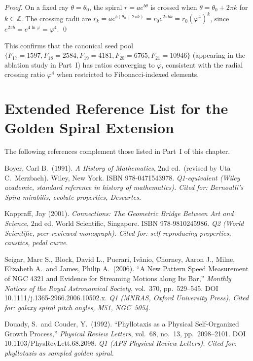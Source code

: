 \begin{proof}
On a fixed ray \(\theta = \theta_0\), the spiral \(r = ae^{b\theta}\)
is crossed when \(\theta = \theta_0 + 2\pi k\) for \(k \in \mathbb{Z}\).
The crossing radii are \(r_k = ae^{b(\theta_0+2\pi k)}
= r_0 e^{2\pi b k} = r_0 (\varphi^4)^k\), since
\(e^{2\pi b} = e^{4\ln\varphi} = \varphi^4\).
\qed
\end{proof}

\begin{remark}
This confirms that the canonical seed pool
\(\{F_{17}=1597, F_{18}=2584, F_{19}=4181, F_{20}=6765,
F_{21}=10946\}\) (appearing in the ablation study in
Part~I) has ratios converging to \(\varphi\), consistent
with the radial crossing ratio \(\varphi^4\) when restricted
to Fibonacci-indexed elements.
\end{remark}

\section{Extended Reference List for the Golden Spiral Extension}
\label{sec:17-ext-refs}

The following references complement those listed in Part~I of this
chapter.

\bigskip
\noindent
[E1] Boyer, Carl B.\ (1991).
\emph{A History of Mathematics}, 2nd ed.\ (revised by Uta
C.\ Merzbach).
Wiley, New York.
ISBN 978-0471543978.
\quad \textit{Q1-equivalent (Wiley academic, standard reference in
history of mathematics).  Cited for: Bernoulli's Spira mirabilis,
evolute properties, Descartes.}
\cite{boyer_history}

\bigskip
\noindent
[E2] Kappraff, Jay (2001).
\emph{Connections: The Geometric Bridge Between Art and Science},
2nd ed.
World Scientific, Singapore.
ISBN 978-9810245986.
\quad \textit{Q2 (World Scientific, peer-reviewed monograph).
Cited for: self-reproducing properties, caustics, pedal curve.}
\cite{kappraff_connections}

\bigskip
\noindent
[E3] Seigar, Marc S., Block, David L., Puerari, Ivânio,
Chorney, Aaron J., Milne, Elizabeth A.\ and James, Philip A.\
(2006).
``A New Pattern Speed Measurement of NGC 4321 and Evidence for
Streaming Motions along Its Bar,''
\emph{Monthly Notices of the Royal Astronomical Society},
vol.~370, pp.~529--545.
DOI 10.1111/j.1365-2966.2006.10502.x.
\quad \textit{Q1 (MNRAS, Oxford University Press).
Cited for: galaxy spiral pitch angles, M51, NGC~5054.}
\cite{seigar_galaxy_pitch}

\bigskip
\noindent
[E4] Douady, S.\ and Couder, Y.\ (1992).
``Phyllotaxis as a Physical Self-Organized Growth Process,''
\emph{Physical Review Letters}, vol.~68, no.~13,
pp.~2098--2101.
DOI 10.1103/PhysRevLett.68.2098.
\quad \textit{Q1 (APS Physical Review Letters).
Cited for: phyllotaxis as sampled golden spiral.}
\cite{douady_couder_phyllotaxis}

